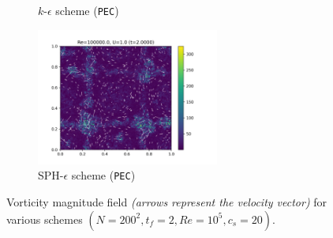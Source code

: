 \begin{figure}[htbp!]
\begin{subfigure}{7cm}
  \caption{$k$-$\epsilon$ scheme (\texttt{PEC})}
  \end{subfigure}
  \begin{subfigure}{7cm}
  \centering\includegraphics[width=6cm]{Code-Figures/long-tgv/c0_20_tait_hdx_2_pec_dtmul_1_mon2017_eps_0.5_no_n_o_files_50_nx_200_pst_10_re_100000_mon2017_tf_2/final_omega_mag.png}
  \caption{SPH-$\epsilon$ scheme (\texttt{PEC})}
  \end{subfigure}
  \caption{Vorticity magnitude field \textit{(arrows represent the velocity vector)} for various schemes $(N=200^2, t_f=2, Re=10^5, c_s=20)$.}
  \label{fig:ltgv-scheme-vorticity}
\end{figure}




